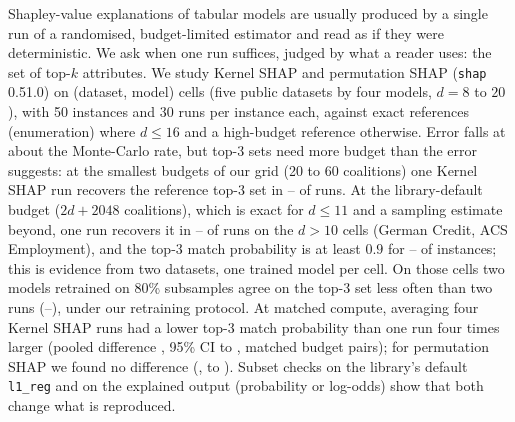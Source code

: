 Shapley-value explanations of tabular models are usually produced by a single run of a randomised, budget-limited estimator and read as if they were deterministic. We ask when one run suffices, judged by what a reader uses: the set of top-$k$ attributes. We study Kernel SHAP and permutation SHAP (\texttt{shap} 0.51.0) on \numnCells{} (dataset, model) cells (five public datasets by four models, $d=8$ to $20$), with 50 instances and 30 runs per instance each, against exact references (enumeration) where $d\le16$ and a high-budget reference otherwise. Error falls at about the Monte-Carlo rate, but top-3 sets need more budget than the error suggests: at the smallest budgets of our grid (20 to 60 coalitions) one Kernel SHAP run recovers the reference top-3 set in \nummatchSmallKLo{}--\nummatchSmallKHi{} of runs. At the library-default budget ($2d+2048$ coalitions), which is exact for $d\le11$ and a sampling estimate beyond, one run recovers it in \numdfltMatchThreeLo{}--\numdfltMatchThreeHi{} of runs on the \numnDefaultCells{} $d>10$ cells (German Credit, ACS Employment), and the top-3 match probability is at least $0.9$ for \numdfltAdeqLo{}--\numdfltAdeqHi{} of instances; this is evidence from two datasets, one trained model per cell. On those cells two models retrained on 80\% subsamples agree on the top-3 set less often than two runs (\numstdretrainSampledLo{}--\numstdretrainSampledHi{}), under our retraining protocol. At matched compute, averaging four Kernel SHAP runs had a lower top-3 match probability than one run four times larger (pooled difference \numhmFourK{}, 95\% CI \numhmFourLoK{} to \numhmFourHiK{}, \numhmFourPairsK{} matched budget pairs); for permutation SHAP we found no difference (\numhmFourP{}, \numhmFourLoP{} to \numhmFourHiP{}). Subset checks on the library's default \texttt{l1\_reg} and on the explained output (probability or log-odds) show that both change what is reproduced.
